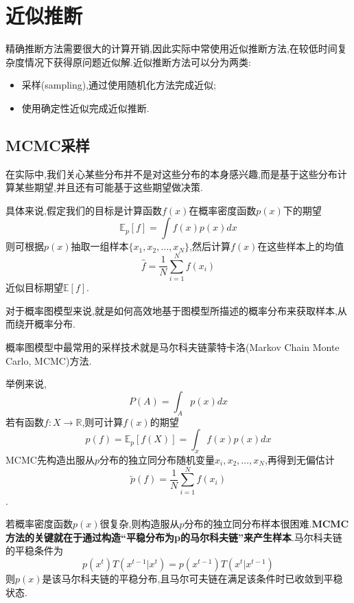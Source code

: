 \section{近似推断}

精确推断方法需要很大的计算开销,因此实际中常使用近似推断方法,在较低时间复杂度情况下获得原问题近似解.近似推断方法可以分为两类:
\begin{itemize}
\item 采样(sampling),通过使用随机化方法完成近似;
\item 使用确定性近似完成近似推断.
\end{itemize}

\subsection{MCMC采样}

在实际中,我们关心某些分布并不是对这些分布的本身感兴趣,而是基于这些分布计算某些期望,并且还有可能基于这些期望做决策.

具体来说,假定我们的目标是计算函数$f(x)$在概率密度函数$p(x)$下的期望
\begin{equation}
\mathbb E_p[f]=\int f(x)p(x)dx
\end{equation}
则可根据$p(x)$抽取一组样本$\{x_1,x_2,\dots,x_N\}$,然后计算$f(x)$在这些样本上的均值
\begin{equation}
\hat f=\frac{1}{N}\sum_{i=1}^Nf(x_i)
\end{equation}
近似目标期望$\mathbb E[f]$.

对于概率图模型来说,就是如何高效地基于图模型所描述的概率分布来获取样本,从而绕开概率分布.

概率图模型中最常用的采样技术就是马尔科夫链蒙特卡洛(Markov Chain Monte Carlo, MCMC)方法.

举例来说,
\begin{equation}
P(A)=\int_Ap(x)dx
\end{equation}
若有函数$f:X\rightarrow\mathbb R$,则可计算$f(x)$的期望
\begin{equation}
p(f)=\mathbb E_p[f(X)]=\int_xf(x)p(x)dx
\end{equation}
MCMC先构造出服从$p$分布的独立同分布随机变量$x_i,x_2,\dots,x_N$,再得到无偏估计
\begin{equation}
\tilde p(f)=\frac{1}{N}\sum_{i=1}^Nf(x_i)
\end{equation}
.

若概率密度函数$p(x)$很复杂,则构造服从$p$分布的独立同分布样本很困难.\textbf{MCMC方法的关键就在于通过构造``平稳分布为p的马尔科夫链''来产生样本}.马尔科夫链的平稳条件为
\begin{equation}
p(x^t)T(x^{t-1}|x^t)=p(x^{t-1})T(x^t|x^{t-1})
\end{equation}
则$p(x)$是该马尔科夫链的平稳分布,且马尔可夫链在满足该条件时已收敛到平稳状态.

